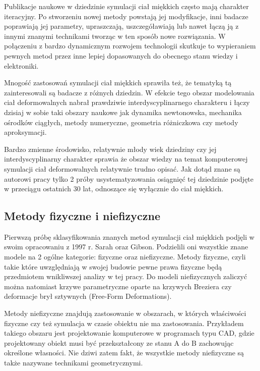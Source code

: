 Publikacje naukowe w dziedzinie symulacji ciał miękkich często mają charakter
iteracyjny. Po stworzeniu nowej metody powstają jej modyfikacje, inni badacze
poprawiają jej parametry, upraszczają,
uszczegóławiają lub nawet łączą ją z innymi znanymi technikami tworząc w ten
sposób nowe rozwiązania. W połączeniu z bardzo dynamicznym rozwojem technologii 
skutkuje to wypieraniem pewnych metod przez inne lepiej dopasowanych do obecnego
stanu wiedzy i elektroniki.

Mnogość zastosowań symulacji ciał miękkich sprawiła też, że tematyką tą
zainteresowali są badacze z różnych dziedzin. W efekcie tego obszar modelowania ciał
deformowalnych nabrał prawdziwie interdyscyplinarnego charakteru i łączy dzisiaj w sobie
taki obszary naukowe jak dynamika newtonowska, mechanika ośrodków ciągłych,
metody numeryczne, geometria różniczkowa czy metody aproksymacji\cite{pbdo}.

Bardzo zmienne środowisko, relatywnie młody wiek dziedziny czy jej 
interdyscyplinarny charakter sprawia
że obszar wiedzy na temat komputerowej symulacji ciał deformowalnych relatywnie
trudno opisać.
Jak dotąd znane są autorowi pracy tylko 2 próby usystematyzowania osiągnięć
tej dziedzinie podjęte w przeciągu ostatnich 30 lat, odnoszące się wyłącznie do
ciał miękkich.

\subsection{Metody fizyczne i niefizyczne}

Pierwszą próbę sklasyfikowania znanych metod symulacji ciał miękkich
podjęli w swoim opracowaniu z 1997 r. Sarah oraz Gibson\cite{TR97-19}. Podzielili
oni wszystkie znane modele na 2 ogólne kategorie: fizyczne oraz niefizyczne. Metody fizyczne, czyli
takie które uwzględniają w swojej budowie pewne prawa fizyczne będą przedmiotem
wnikliwszej analizy w tej pracy. Do modeli niefizycznych zaliczyć można natomiast
krzywe parametryczne oparte na krzywych Breziera czy deformacje brył sztywnych (Free-Form Deformations).\cite{pbdo}

Metody niefizyczne znajdują zastosowanie w obszarach, w których właściwości
fizyczne czy też symulacja w czasie obiektu nie ma zastosowania. Przykładem
takiego obszaru jest projektowanie komputerowe w programach typu CAD, gdzie
projektowany obiekt musi być przekształcony ze stanu A do B zachowując określone
własności. Nie dziwi zatem fakt, że wszystkie metody niefizyczne są także 
nazywane technikami geometrycznymi.

